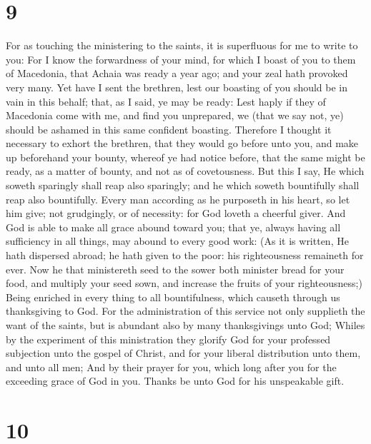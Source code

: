 \hypertarget{section-8}{%
\section{9}\label{section-8}}

 For as touching the ministering to the saints, it is
superfluous for me to write to you:  For I know the
forwardness of your mind, for which I boast of you to them of Macedonia,
that Achaia was ready a year ago; and your zeal hath provoked very many.
 Yet have I sent the brethren, lest our boasting of you
should be in vain in this behalf; that, as I said, ye may be ready:
 Lest haply if they of Macedonia come with me, and find
you unprepared, we (that we say not, ye) should be ashamed in this same
confident boasting.  Therefore I thought it necessary to
exhort the brethren, that they would go before unto you, and make up
beforehand your bounty, whereof ye had notice before, that the same
might be ready, as a matter of bounty, and not as of covetousness.
 But this I say, He which soweth sparingly shall reap also
sparingly; and he which soweth bountifully shall reap also bountifully.
 Every man according as he purposeth in his heart, so let
him give; not grudgingly, or of necessity: for God loveth a cheerful
giver.  And God is able to make all grace abound toward
you; that ye, always having all sufficiency in all things, may abound to
every good work:  (As it is written, He hath dispersed
abroad; he hath given to the poor: his righteousness remaineth for ever.
 Now he that ministereth seed to the sower both minister
bread for your food, and multiply your seed sown, and increase the
fruits of your righteousness;)  Being enriched in every
thing to all bountifulness, which causeth through us thanksgiving to
God.  For the administration of this service not only
supplieth the want of the saints, but is abundant also by many
thanksgivings unto God;  Whiles by the experiment of this
ministration they glorify God for your professed subjection unto the
gospel of Christ, and for your liberal distribution unto them, and unto
all men;  And by their prayer for you, which long after
you for the exceeding grace of God in you.  Thanks be
unto God for his unspeakable gift.

\hypertarget{section-9}{%
\section{10}\label{section-9}}


